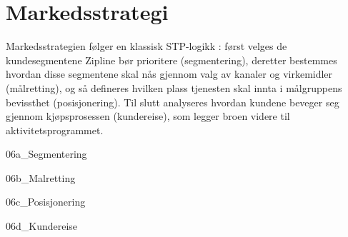 \section{Markedsstrategi}

Markedsstrategien følger en klassisk STP-logikk \parencite{kotlerkeller2016}:
først velges de kundesegmentene Zipline bør prioritere (segmentering),
deretter bestemmes hvordan disse segmentene skal nås gjennom valg av kanaler
og virkemidler (målretting), og så defineres hvilken plass tjenesten skal
innta i målgruppens bevissthet (posisjonering). Til slutt analyseres hvordan
kundene beveger seg gjennom kjøpsprosessen (kundereise), som legger broen
videre til aktivitetsprogrammet.

{06a_Segmentering}

{06b_Malretting}

{06c_Posisjonering}

{06d_Kundereise}
